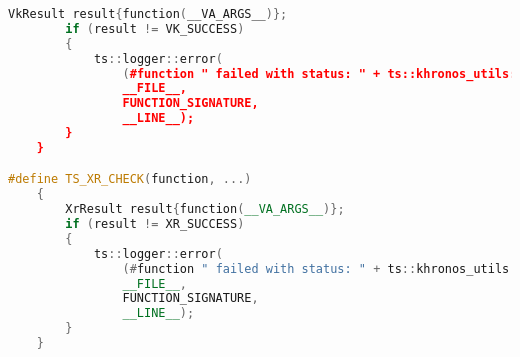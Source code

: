 \begin{itemize}
\begin{lstlisting}[language=c++, caption=Khronos Utils (./engine/src/khronos\_utils.h)]
        VkResult result{function(__VA_ARGS__)};                                                            \
        if (result != VK_SUCCESS)                                                                          \
        {                                                                                                  \
            ts::logger::error(                                                                             \
                (#function " failed with status: " + ts::khronos_utils::vkResultToString(result)).c_str(), \
                __FILE__,                                                                                  \
                FUNCTION_SIGNATURE,                                                                        \
                __LINE__);                                                                                 \
        }                                                                                                  \
    }

#define TS_XR_CHECK(function, ...)                                                                         \
    {                                                                                                      \
        XrResult result{function(__VA_ARGS__)};                                                            \
        if (result != XR_SUCCESS)                                                                          \
        {                                                                                                  \
            ts::logger::error(                                                                             \
                (#function " failed with status: " + ts::khronos_utils::xrResultToString(result)).c_str(), \
                __FILE__,                                                                                  \
                FUNCTION_SIGNATURE,                                                                        \
                __LINE__);                                                                                 \
        }                                                                                                  \
    }


\end{lstlisting}
\end{itemize}
